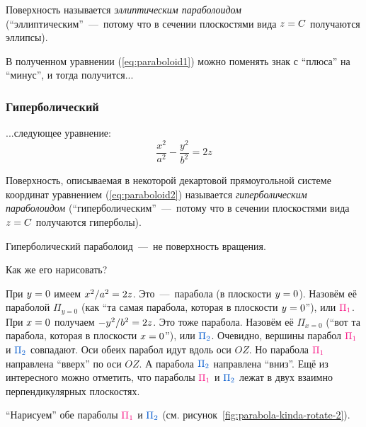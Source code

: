 \documentclass[a4paper,12pt]{article}
\begin{document}
  Поверхность называется \emph{эллиптическим параболоидом} (``эллиптическим''~---~потому что в сечении плоскостями вида $z \hm= C$ получаются эллипсы).
  
  В полученном уравнении (\ref{eq:paraboloid1}) можно поменять знак с ``плюса'' на ``минус'', и тогда получится...
  
  
  \subsubsection{Гиперболический}
  
  ...следующее уравнение:
  \begin{equation}
    \label{eq:paraboloid2}
    \boxed{
      \frac{x^2}{a^2} - \frac{y^2}{b^2} = 2z
    }
  \end{equation}
  
  Поверхность, описываемая в некоторой декартовой прямоугольной системе координат уравнением (\ref{eq:paraboloid2}) называется \emph{гиперболическим параболоидом} (``гиперболическим''~---~потому что в сечении плоскостями вида $z \hm= C$ получаются гиперболы).
  
  Гиперболический параболоид~---~не поверхность вращения.
  
  Как же его нарисовать?
  
  При $y \hm= 0$ имеем $x^2 \hm/ a^2 \hm= 2z$.
  Это~---~парабола (в плоскости $y \hm= 0$).
  Назовём её параболой $\Pi_{y=0}$ (как ``та самая парабола, которая в плоскости $y \hm= 0$''), или $\textcolor{my-red}{\Pi_1}$.
  При $x \hm= 0$ получаем $-y^2 \hm/ b^2 \hm= 2z$.
  Это тоже парабола.
  Назовём её $\Pi_{x=0}$ (``вот та парабола, которая в плоскости $x \hm= 0$''), или $\textcolor{my-blue}{\Pi_2}$.
  Очевидно, вершины парабол $\textcolor{my-red}{\Pi_1}$ и $\textcolor{my-blue}{\Pi_2}$ совпадают.
  Оси обеих парабол идут вдоль оси $OZ$.
  Но парабола $\textcolor{my-red}{\Pi_1}$ направлена ``вверх'' по оси $OZ$.
  А парабола $\textcolor{my-blue}{\Pi_2}$ направлена ``вниз''.
  Ещё из интересного можно отметить, что параболы $\textcolor{my-red}{\Pi_1}$ и $\textcolor{my-blue}{\Pi_2}$ лежат в двух взаимно перпендикулярных плоскостях.
  
  ``Нарисуем'' обе параболы $\textcolor{my-red}{\Pi_1}$ и $\textcolor{my-blue}{\Pi_2}$ (см. рисунок~\ref{fig:parabola-kinda-rotate-2}).
  
\end{document}
